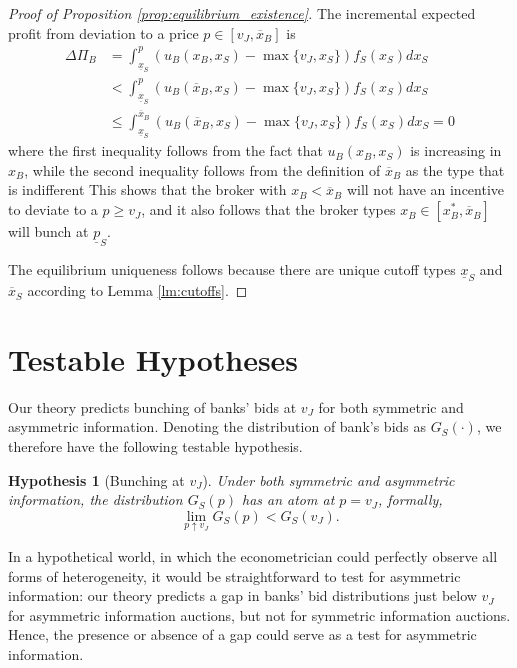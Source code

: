 \documentclass[11pt,twopage]{article}
\newcommand{\ol}{\overline}
\newcommand{\ul}{\underline}
\newtheorem{conjecture}{Hypothesis}
{\bf}{\it}
\begin{document}
\begin{proof}[Proof of Proposition \ref{prop:equilibrium_existence}]
  The incremental expected profit from deviation to a price $p \in
  [v_J,\ol x_B]$ is
  \begin{align*}
    \Delta \Pi_B &= \int_{\ul x_S}^{p} (u_B(x_B,x_S) - \max \{ v_J,
    x_S \}) f_S(x_S) dx_S
    \\
    &< \int_{\ul x_S}^{p} (u_B(\ol x_B,x_S) - \max \{ v_J, x_S \})
    f_S(x_S) dx_S
    \\
    &\leq \int_{\ul x_S}^{\ol x_B} (u_B(\ol x_B,x_S) - \max \{ v_J,
    x_S \}) f_S(x_S) dx_S=0
  \end{align*}
  where the first inequality follows from the fact that $u_B(x_B,x_S)$
  is increasing in $x_B$, while the second inequality follows from the
  definition of $\ol x_B$ as the type that is indifferent This shows
  that the broker with $x_B < \ol x_B$ will not have an incentive to
  deviate to a $p\geq v_J$, and it also follows that the broker types
  $x_B \in [x_B^*,\ol x_B]$ will bunch at $\ul p_S$.
%


  The equilibrium uniqueness follows because there are unique cutoff
  types $\underline x_S$ and $\overline x_S$ according to Lemma
  \ref{lm:cutoffs}.
\end{proof}






\section{Testable Hypotheses}
\label{sec:empir-pred}

Our theory predicts bunching of banks' bids at $v_J$ for both
symmetric and asymmetric information. Denoting the distribution of
bank's bids as $G_S(\cdot)$, we therefore have the following testable
hypothesis.
\begin{conjecture}[Bunching at $v_J$]\label{hyp:bunching}
  Under both symmetric and asymmetric information, the distribution
  $G_S(p)$ has an atom at $p = v_J$, formally,
  \[
  \lim_{p\uparrow v_J} G_S(p) <G_S(v_J).
  \]
\end{conjecture}

In a hypothetical world, in which the econometrician could perfectly
observe all forms of heterogeneity, it would be straightforward to
test for asymmetric information: our theory predicts a gap in banks'
bid distributions just below $v_J$ for asymmetric information
auctions, but not for symmetric information auctions. Hence, the
presence or absence of a gap could serve as a test for asymmetric
information.
\end{document}
